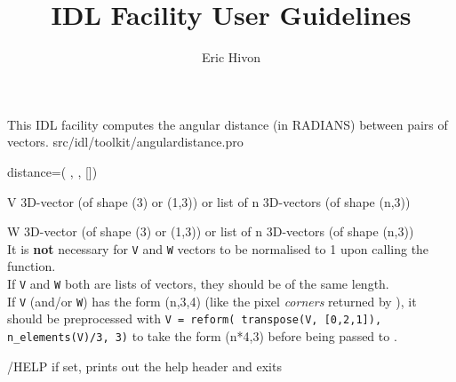 

\sloppy

\title{\healpix IDL Facility User Guidelines}
 \section[angulardistance]{ }
\label{idl:angulardistance}
\author{Eric Hivon}

\begin{facility}
{This IDL facility computes the angular distance (in RADIANS) between pairs of vectors.
}
{src/idl/toolkit/angulardistance.pro}
\end{facility}

\begin{IDLformat}
{%
{distance}=\thedocid(%
, 
,
[])}
\end{IDLformat}

\begin{qualifiers}
  \begin{qulist}{} %
    \item[V] %
      3D-vector (of shape (3) or (1,3)) or list of n 3D-vectors (of shape (n,3))
    \item[W] %
      3D-vector (of shape (3) or (1,3)) or list of n 3D-vectors (of shape
(n,3))\\
	It is {\bf not} necessary for \texttt{V} and \texttt{W} vectors to be normalised to 1
        upon calling the function.\\
 	If \texttt{V} and \texttt{W} both are lists of vectors, 
         they should be of the same length.\\
If {\tt V} (and/or {\tt W}) has the form (n,3,4) (like the pixel {\em corners} returned by
 ), it should be preprocessed with
 \texttt{V = reform( transpose(V, [0,2,1]), n\_elements(V)/3, 3)}
 to take the form (n*4,3)
  before being passed to \thedocid.  
\end{qulist}
\end{qualifiers}

\begin{keywords}
  \begin{kwlist}{} %
    \item[/HELP] %
	if set, prints out the help header and exits
  \end{kwlist}
\end{keywords}  


